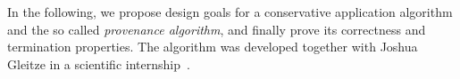 In the following, we propose design goals for a conservative application algorithm and the so called \emph{provenance algorithm}, and finally prove its correctness and termination properties.
The algorithm was developed together with Joshua Gleitze in a scientific internship~\cite{gleitze2020orchestration}.






